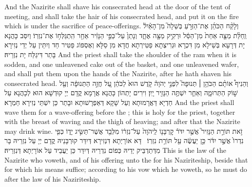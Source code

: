{And the Nazirite shall shave his consecrated head at the door of the tent of meeting, and shall take the hair of his consecrated head, and put it on the fire which is under the sacrifice of peace-offerings.}{}
{וְלָקַ֨ח הַכֹּהֵ֜ן אֶת־הַזְּרֹ֣עַ בְּשֵׁלָה֮ מִן־הָאַ֒יִל֒ וְֽחַלַּ֨ת מַצָּ֤ה אַחַת֙ מִן־הַסַּ֔ל וּרְקִ֥יק מַצָּ֖ה אֶחָ֑ד וְנָתַן֙ עַל־כַּפֵּ֣י הַנָּזִ֔יר אַחַ֖ר הִֽתְגַּלְּח֥וֹ אֶת־נִזְרֽוֹ׃
}
{וְיִסַּב כָּהֲנָא יָת דְּרָעָא בְּשֵׁילָא מִן דִּכְרָא וּגְרִיצְתָא פַטִּירְתָא חֲדָא מִן סַלָּא וְאֶסְפּוֹג פַּטִּיר חַד וְיִתֵּין עַל יְדֵי נְזִירָא בָּתַר דִּיגַלַּח יָת נִזְרֵיהּ׃}
{And the priest shall take the shoulder of the ram when it is sodden, and one unleavened cake out of the basket, and one unleavened wafer, and shall put them upon the hands of the Nazirite, after he hath shaven his consecrated head.}{}
{וְהֵנִיף֩ אוֹתָ֨ם הַכֹּהֵ֥ן \small ׀\normalsize  תְּנוּפָה֮ לִפְנֵ֣י יְהֹוָה֒ קֹ֤דֶשׁ הוּא֙ לַכֹּהֵ֔ן עַ֚ל חֲזֵ֣ה הַתְּנוּפָ֔ה וְעַ֖ל שׁ֣וֹק הַתְּרוּמָ֑ה וְאַחַ֛ר יִשְׁתֶּ֥ה הַנָּזִ֖יר יָֽיִן׃
}
{וִירִים יָתְהוֹן כָּהֲנָא אֲרָמָא קֳדָם יְיָ קוּדְשָׁא הוּא לְכָהֲנָא עַל חַדְיָא דַּאֲרָמוּתָא וְעַל שָׁקָא דְּאַפְרָשׁוּתָא וּבָתַר כֵּן יִשְׁתֵּי נְזִירָא חַמְרָא׃}
{And the priest shall wave them for a wave-offering before the \lord; this is holy for the priest, together with the breast of waving and the thigh of heaving; and after that the Nazirite may drink wine.}{}
{זֹ֣את תּוֹרַ֣ת הַנָּזִיר֮ אֲשֶׁ֣ר יִדֹּר֒ קׇרְבָּנ֤וֹ לַֽיהֹוָה֙ עַל־נִזְר֔וֹ מִלְּבַ֖ד אֲשֶׁר־תַּשִּׂ֣יג יָד֑וֹ כְּפִ֤י נִדְרוֹ֙ אֲשֶׁ֣ר יִדֹּ֔ר כֵּ֣ן יַעֲשֶׂ֔ה עַ֖ל תּוֹרַ֥ת נִזְרֽוֹ׃ \petucha 
{}}
{דָּא אוֹרָיְתָא דִּנְזִירָא דְּיִדַּר קוּרְבָּנֵיהּ קֳדָם יְיָ עַל נִזְרֵיהּ בָּר מִדְּתַדְבֵּיק יְדֵיהּ כְּפוֹם נִדְרֵיהּ דְּיִדַּר כֵּן יַעֲבֵיד עַל אוֹרָיְתָא דְּנִזְרֵיהּ׃}
{This is the law of the Nazirite who voweth, and of his offering unto the \lord\space for his Naziriteship, beside that for which his means suffice; according to his vow which he voweth, so he must do after the law of his Naziriteship.}{}
